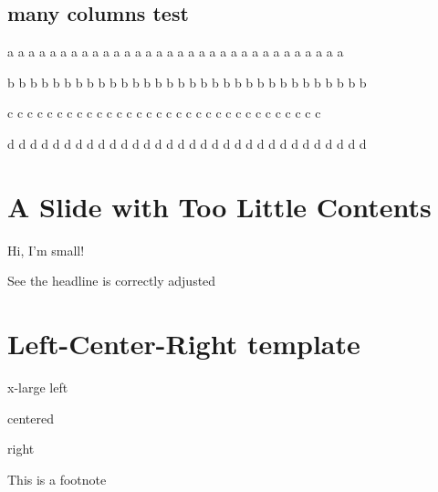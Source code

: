 \subsection{many columns test}
\label{sec-8-2}


\begin{container-fluid}
\begin{row-fluid}
\begin{span3}
a a a a a a a a a a a a a a a a a a a a a a a a a a a a a a a a
\end{span3}
\begin{span3}
b b b b b b b b b b b b b b b b b b b b b b b b b b b b b b b b
\end{span3}
\begin{span3}
c c c c c c c c c c c c c c c c c c c c c c c c c c c c c c c c
\end{span3}
\begin{span3}
d d d d d d d d d d d d d d d d d d d d d d d d d d d d d d d d
\end{span3}
\end{row-fluid}
\end{container-fluid}

\section{A Slide with Too Little Contents}
\label{sec-9}

\begin{center}
\begin{smaller}
Hi, I'm small!
\end{smaller}
\end{center}

\begin{note}
See the headline is correctly adjusted
\end{note}
\section{Left-Center-Right template}
\label{sec-10}

\begin{xlarge}
x-large left
\begin{center}
centered
\end{center}
\begin{alignright}
right
\end{alignright}
\end{xlarge}

\begin{note}
This is a footnote
\end{note}
